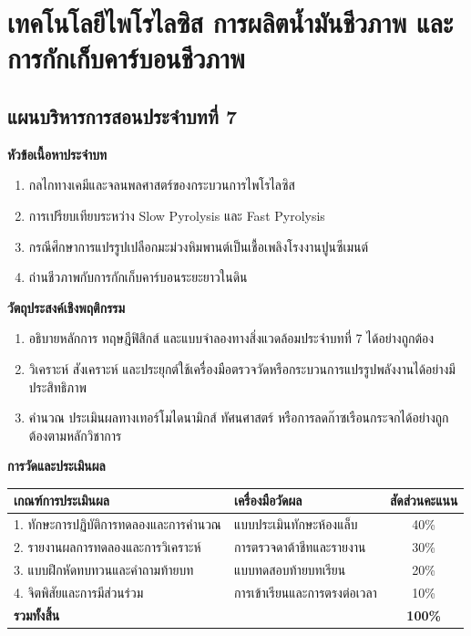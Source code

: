 \chapter{เทคโนโลยีไพโรไลซิส การผลิตน้ำมันชีวภาพ และการกักเก็บคาร์บอนชีวภาพ}
\label{chap:ch07}

\section*{แผนบริหารการสอนประจำบทที่ 7}

\noindent\textbf{หัวข้อเนื้อหาประจำบท}
\begin{enumerate}
    \item กลไกทางเคมีและจลนพลศาสตร์ของกระบวนการไพโรไลซิส
    \item การเปรียบเทียบระหว่าง Slow Pyrolysis และ Fast Pyrolysis
    \item กรณีศึกษาการแปรรูปเปลือกมะม่วงหิมพานต์เป็นเชื้อเพลิงโรงงานปูนซีเมนต์
    \item ถ่านชีวภาพกับการกักเก็บคาร์บอนระยะยาวในดิน
\end{enumerate}

\noindent\textbf{วัตถุประสงค์เชิงพฤติกรรม}
\begin{enumerate}
    \item อธิบายหลักการ ทฤษฎีฟิสิกส์ และแบบจำลองทางสิ่งแวดล้อมประจำบทที่ 7 ได้อย่างถูกต้อง
    \item วิเคราะห์ สังเคราะห์ และประยุกต์ใช้เครื่องมือตรวจวัดหรือกระบวนการแปรรูปพลังงานได้อย่างมีประสิทธิภาพ
    \item คำนวณ ประเมินผลทางเทอร์โมไดนามิกส์ ทัศนศาสตร์ หรือการลดก๊าซเรือนกระจกได้อย่างถูกต้องตามหลักวิชาการ
\end{enumerate}

\noindent\textbf{การวัดและประเมินผล}
\begin{table}[H]
\centering\small
\begin{tabularx}{\textwidth}{p{} p{} c}
\toprule
\textbf{เกณฑ์การประเมินผล} & \textbf{เครื่องมือวัดผล} & \textbf{สัดส่วนคะแนน} \\
\midrule
1. ทักษะการปฏิบัติการทดลองและการคำนวณ & แบบประเมินทักษะห้องแล็บ & 40\% \\
2. รายงานผลการทดลองและการวิเคราะห์ & การตรวจดาต้าชีทและรายงาน & 30\% \\
3. แบบฝึกหัดทบทวนและคำถามท้ายบท & แบบทดสอบท้ายบทเรียน & 20\% \\
4. จิตพิสัยและการมีส่วนร่วม & การเข้าเรียนและการตรงต่อเวลา & 10\% \\
\midrule
\textbf{รวมทั้งสิ้น} & & \textbf{100\%} \\
\bottomrule
\end{tabularx}
\end{table}
\newpage


